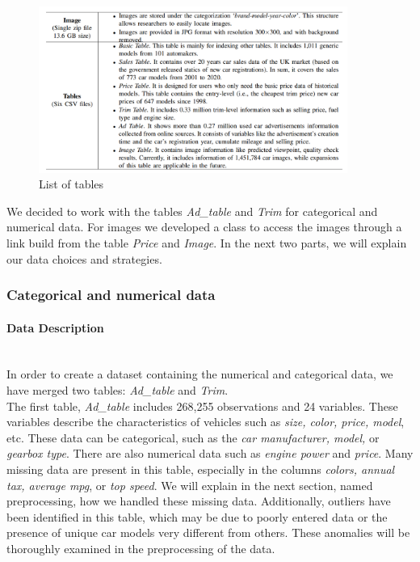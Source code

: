 \documentclass[12pt]{article}
\begin{document}
\FloatBarrier
\begin{figure}[ht]
    \centering
    \includegraphics[width=0.9\textwidth]{overviewDVMdata.png}
    \caption{List of tables}
    \label{table:List of tables}
\end{figure}
\FloatBarrier

\noindent We decided to work with the tables \textit{Ad\_table} and \textit{Trim} for categorical and numerical data. For images we developed a class to access the images through a link build from the table \textit{Price} and \textit{Image}.
\noindent In the next two parts, we will explain our data choices and strategies. 


\subsubsection{Categorical and numerical data}

\paragraph{Data Description}
~~\\ [0.1 cm]

\noindent In order to create a dataset containing the numerical and categorical data, we have merged two tables:  \textit{Ad\_table} and \textit{Trim}.\\

\noindent The first table, \textit{Ad\_table} includes 268,255 observations and 24 variables. These variables describe the characteristics of vehicles such as \textit{size, color, price, model}, etc. These data can be categorical, such as the \textit{car manufacturer, model,} or \textit{gearbox type}. There are also numerical data such as \textit{engine power} and \textit{price}. Many missing data are present in this table, especially in the columns \textit{colors, annual tax, average mpg}, or \textit{top speed}. We will explain in the next section, named preprocessing, how we handled these missing data. Additionally, outliers have been identified in this table, which may be due to poorly entered data or the presence of unique car models very different from others. These anomalies will be thoroughly examined in the preprocessing of the data.\\
\end{document}
